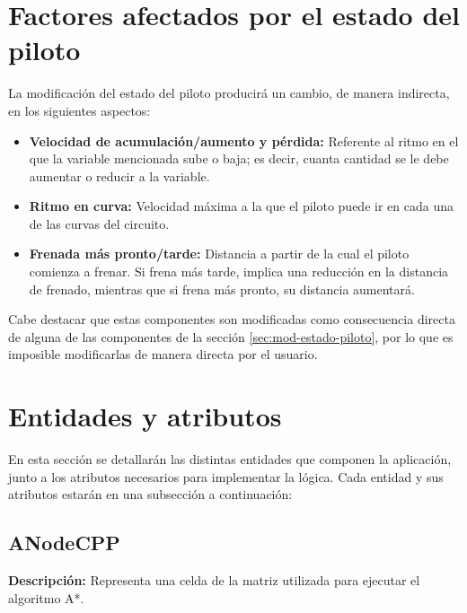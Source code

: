 \section{Factores afectados por el estado del piloto}
\label{sec:componente-estado}

La modificación del estado del piloto producirá un cambio, de manera indirecta, en los siguientes aspectos:

\begin{itemize}
    \item \textbf{Velocidad de acumulación/aumento y pérdida: }Referente al ritmo en el que la variable mencionada sube o baja; es decir, cuanta cantidad se le debe aumentar o reducir a la variable.
    \item \textbf{Ritmo en curva: }Velocidad máxima a la que el piloto puede ir en cada una de las curvas del circuito.
    \item \textbf{Frenada más pronto/tarde: }Distancia a partir de la cual el piloto comienza a frenar. Si frena más tarde, implica una reducción en la distancia de frenado, mientras que si frena más pronto, su distancia aumentará.
\end{itemize}

Cabe destacar que estas componentes son modificadas como consecuencia directa de alguna de las componentes de la sección \ref{sec:mod-estado-piloto}, por lo que es imposible modificarlas de manera directa por el usuario.

\newpage

\section{Entidades y atributos}

En esta sección se detallarán las distintas entidades que componen la aplicación, junto a los atributos necesarios para implementar la lógica. Cada entidad y sus atributos estarán en una subsección a continuación:

\subsection{ANodeCPP}
\textbf{Descripción: }Representa una celda de la matriz utilizada para ejecutar el algoritmo A*.

